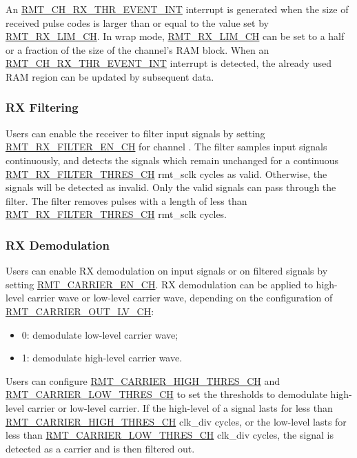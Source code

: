 \documentclass[main\_\_EN.tex]{subfiles}
\begin{document}
An \hyperref[int:RMTCHMRXTHREVENTINT]{RMT\_CH\_RX\_THR\_EVENT\_INT} interrupt is generated when the size of received pulse codes is larger than or equal to the value set by \hyperref[fielddesc:RMTRXLIMCHM]{RMT\_RX\_LIM\_CH}.
In wrap mode, \hyperref[fielddesc:RMTRXLIMCHM]{RMT\_RX\_LIM\_CH} can be set to a half or a fraction of the size of the channel's RAM block.
When an \hyperref[int:RMTCHMRXTHREVENTINT]{RMT\_CH\_RX\_THR\_EVENT\_INT} interrupt is detected, the already used RAM region can be updated by subsequent data.


\subsubsection{RX Filtering}

Users can enable the receiver to filter input signals by setting \hyperref[fielddesc:RMTRXFILTERENCHM]{RMT\_RX\_FILTER\_EN\_CH} for channel . The filter samples input signals continuously, and detects the signals which remain unchanged for a continuous \hyperref[fielddesc:RMTRXFILTERTHRESCHM]{RMT\_RX\_FILTER\_THRES\_CH} rmt\_sclk cycles as valid. Otherwise, the signals will be detected as invalid. Only the valid signals can pass through the filter. The filter removes pulses with a length of less than \hyperref[fielddesc:RMTRXFILTERTHRESCHM]{RMT\_RX\_FILTER\_THRES\_CH} rmt\_sclk cycles.


\subsubsection{RX Demodulation}

Users can enable RX demodulation on input signals or on filtered signals by setting \hyperref[fielddesc:RMTCARRIERENCHM]{RMT\_CARRIER\_EN\_CH}. RX demodulation can be applied to high-level carrier wave or low-level carrier wave, depending on the configuration of \hyperref[fielddesc:RMTCARRIEROUTLVCHM]{RMT\_CARRIER\_OUT\_LV\_CH}: 
\begin{itemize}
    \item 0: demodulate low-level carrier wave;
    \item 1: demodulate high-level carrier wave.
\end{itemize}

Users can configure \hyperref[fielddesc:RMTCARRIERHIGHTHRESCHM]{RMT\_CARRIER\_HIGH\_THRES\_CH} and \hyperref[fielddesc:RMTCARRIERLOWTHRESCHM]{RMT\_CARRIER\_LOW\_THRES\_CH} to set the thresholds to demodulate high-level carrier or low-level carrier. If the high-level of a signal lasts for less than \hyperref[fielddesc:RMTCARRIERHIGHTHRESCHM]{RMT\_CARRIER\_HIGH\_THRES\_CH} clk\_div cycles, or the low-level lasts for less than \hyperref[fielddesc:RMTCARRIERLOWTHRESCHM]{RMT\_CARRIER\_LOW\_THRES\_CH} clk\_div cycles, the signal is detected as a carrier and is then filtered out.
\end{document}

